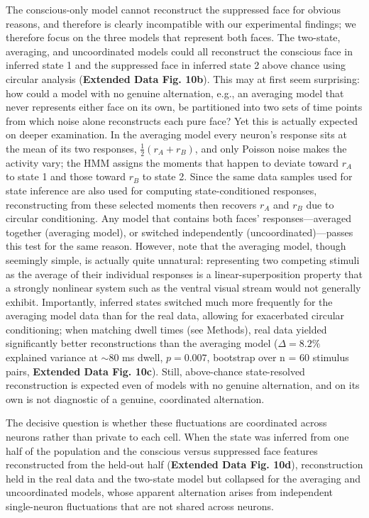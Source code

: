 \documentclass{article}
\begin{document}
The conscious-only model cannot reconstruct the suppressed face for obvious reasons, and therefore is clearly incompatible with our experimental findings; we therefore focus on the three models that represent both faces. The two-state, averaging, and uncoordinated models could all reconstruct the conscious face in inferred state 1 and the suppressed face in inferred state 2 above chance using circular analysis (\textbf{Extended Data Fig. 10b}). This may at first seem surprising: how could a model with no genuine alternation, e.g., an averaging model that never represents either face on its own, be partitioned into two sets of time points from which noise alone reconstructs each pure face? Yet this is actually expected on deeper examination. In the averaging model every neuron's response sits at the mean of its two responses, $\frac{1}{2}(r_A + r_B)$, and only Poisson noise makes the activity vary; the HMM assigns the moments that happen to deviate toward $r_A$ to state 1 and those toward $r_B$ to state 2. Since the same data samples used for state inference are also used for computing state-conditioned responses, reconstructing from these selected moments then recovers $r_A$ and $r_B$ due to circular conditioning. Any model that contains both faces' responses---averaged together (averaging model), or switched independently (uncoordinated)---passes this test for the same reason. However, note that the averaging model, though seemingly simple, is actually quite unnatural: representing two competing stimuli as the average of their individual responses is a linear-superposition property that a strongly nonlinear system such as the ventral visual stream would not generally exhibit. Importantly, inferred states switched much more frequently for the averaging model data than for the real data, allowing for exacerbated circular conditioning; when matching dwell times (see Methods), real data yielded significantly better reconstructions than the averaging model ($\Delta = 8.2\%$ explained variance at ${\sim}80$ ms dwell, $p = 0.007$, bootstrap over n = 60 stimulus pairs, \textbf{Extended Data Fig. 10c}). Still, above-chance state-resolved reconstruction is expected even of models with no genuine alternation, and on its own is not diagnostic of a genuine, coordinated alternation.

The decisive question is whether these fluctuations are coordinated across neurons rather than private to each cell. When the state was inferred from one half of the population and the conscious versus suppressed face features reconstructed from the held-out half (\textbf{Extended Data Fig. 10d}), reconstruction held in the real data and the two-state model but collapsed for the averaging and uncoordinated models, whose apparent alternation arises from independent single-neuron fluctuations that are not shared across neurons.
\end{document}
